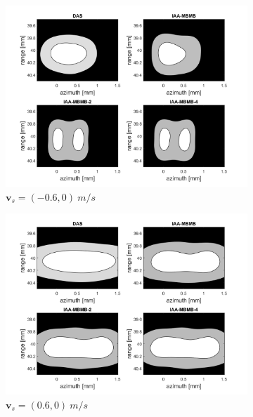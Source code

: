 \begin{figure}[ht]
    \centering
    \begin{subfigure}[t]{0.48\linewidth}
        \includegraphics[width=\linewidth]{./images/results/3/motion_0_-06.png}
        \caption{$\boldsymbol{v}_s = (-0.6, 0)~m/s$}
        \label{fig:double_lateral}
    \end{subfigure}
    \quad
    \begin{subfigure}[t]{0.48\linewidth}
        \includegraphics[width=\linewidth]{./images/results/3/motion_0_06.png}
        \caption{$\boldsymbol{v}_s = (0.6, 0)~m/s$}
    \end{subfigure}
    \quad
    \begin{subfigure}[t]{0.48\linewidth}

\end{subfigure}
\end{figure}
